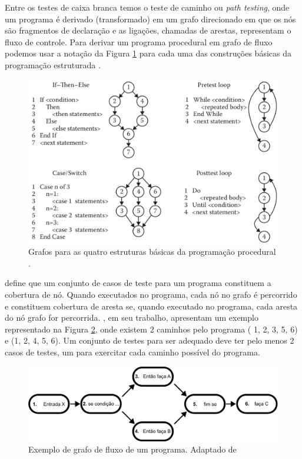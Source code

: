 Entre os testes de caixa branca temos o teste de caminho ou \textit{path testing}, onde um programa é derivado (transformado) em um grafo direcionado em que os nós são fragmentos de declaração e as ligações, chamadas de arestas, representam o fluxo de controle. Para derivar um programa procedural em grafo de fluxo podemos usar a notação da Figura \ref{fig:4estrutura_basica} para cada uma das construções básicas da programação estruturada \cite{jorgensen2016software}.

\begin{figure}[ht]
\centering
\includegraphics[scale=0.3]{imagens/const_basica_grafo.png}
\caption{Grafos para as quatro estruturas básicas da programação procedural \cite{jorgensen2016software}.}
\label{fig:4estrutura_basica}
\end{figure}

\cite{jorgensen2016software} define que um conjunto de casos de teste para um programa constituem a cobertura de nó. Quando executados no programa, cada nó no grafo é percorrido e constituem cobertura de aresta se, quando executado no programa, cada aresta do nó grafo for percorrida. \cite{winikoff2014testability}, em seu trabalho, apresentam um exemplo representado na Figura \ref{fig:exemplo_grafo}, onde existem 2 caminhos pelo programa ( 1, 2, 3, 5, 6) e (1, 2, 4, 5, 6). Um conjunto de testes para ser adequado deve ter pelo menos 2 casos de testes, um para exercitar cada caminho possível do programa.

\begin{figure}[ht]
\centering
\includegraphics[scale=0.7]{imagens/exemplo_grafo.pdf}
\caption{Exemplo de grafo de fluxo de um programa. Adaptado de \cite{winikoff2014testability}}
\label{fig:exemplo_grafo}
\end{figure}


